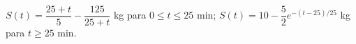 $S(t)=\dfrac{25+t}{5}-\dfrac{125}{25+t}$ kg para $0\le t\le25$ min; $S(t)=10-\dfrac52e^{-(t-25)/25}$ kg para $t\ge25$ min.
